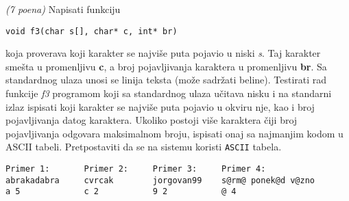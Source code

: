 \begin{Exercise}[label=v1.3_01] 
{\em (7 poena)} 
Napisati funkciju
\begin{center} 
\begin{verbatim}void f3(char s[], char* c, int* br)
\end{verbatim}
\end{center}
   koja proverava koji karakter se najviše puta pojavio u niski \textit{s}.
   Taj karakter smešta u promenljivu \textbf{c}, a broj pojavljivanja karaktera u promenljivu \textbf{br}.
   Sa standardnog ulaza unosi se linija teksta (može sadr\v zati beline).
   Testirati rad funkcije \textit{f3} programom koji sa standardnog ulaza učitava nisku i na standarni izlaz ispisati koji karakter se najviše puta pojavio u okviru nje, kao i broj pojavljivanja datog karaktera. Ukoliko postoji više karaktera čiji broj pojavljivanja odgovara maksimalnom broju, ispisati onaj sa najmanjim kodom u ASCII tabeli.
Pretpostaviti da se na sistemu koristi {\tt ASCII} tabela.
\begin{center}
\begin{verbatim}
Primer 1:       Primer 2:     Primer 3:     Primer 4:  
abrakadabra     cvrcak        jorgovan99    s@rm@ ponek@d v@zno
a 5             c 2           9 2           @ 4        
\end{verbatim}
\end{center}
\end{Exercise}
\begin{Answer}[ref=v1.3_01]
\end{Answer}



